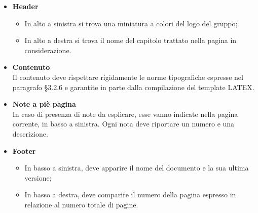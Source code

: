                     \begin{itemize}
                        \item\textbf{Header}
                            \begin{itemize} 
                                \item In alto a sinistra si trova una miniatura a colori del logo del gruppo;
                                \item In alto a destra si trova il nome del capitolo trattato nella pagina in considerazione.
                            \end{itemize}
                        \item\textbf{Contenuto} \\
                            Il contenuto deve rispettare rigidamente le norme tipografiche espresse nel paragrafo §3.2.6 e garantite in parte dalla compilazione del template LATEX.
                        \item\textbf{Note a piè pagina} \\
                            In caso di presenza di note da esplicare, esse vanno indicate nella pagina corrente, in basso a sinistra. Ogni nota deve riportare un numero e una descrizione.
                        \item\textbf{Footer}
                            \begin{itemize} 
                                \item In basso a sinistra, deve apparire il nome del documento e la sua ultima versione;
                                \item In basso a destra, deve comparire il numero della pagina espresso in relazione al numero totale di pagine.
                            \end{itemize}
                    \end{itemize}
